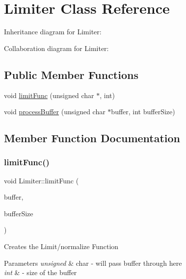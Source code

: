 \hypertarget{classLimiter}{}\section{Limiter Class Reference}
\label{classLimiter}


Inheritance diagram for Limiter\+:


Collaboration diagram for Limiter\+:
\subsection*{Public Member Functions}
\begin{DoxyCompactItemize}
\item 
void \hyperlink{classLimiter_a3fcc37e0ac0d7eb6ea9ce45fc8d78e99}{limit\+Func} (unsigned char $\ast$, int)
\item 
void \hyperlink{classLimiter_a226a4a5c3890a5dfbe35220595c3df2b}{process\+Buffer} (unsigned char $\ast$buffer, int buffer\+Size)
\end{DoxyCompactItemize}


\subsection{Member Function Documentation}
\mbox{\label{classLimiter_a3fcc37e0ac0d7eb6ea9ce45fc8d78e99}} 
\subsubsection{\texorpdfstring{limit\+Func()}{limitFunc()}}
{\footnotesize\ttfamily void Limiter\+::limit\+Func (\begin{DoxyParamCaption}\item[{unsigned char $\ast$}]{buffer,  }\item[{int}]{buffer\+Size }\end{DoxyParamCaption})}

Creates the Limit/normalize Function 
\begin{DoxyParams}{Parameters}
{\em unsigned} & char -\/ will pass buffer through here \\
\hline
{\em int} & -\/ size of the buffer \\
\hline
\end{DoxyParams}
\mbox{\label{classLimiter_a226a4a5c3890a5dfbe35220595c3df2b}} 
